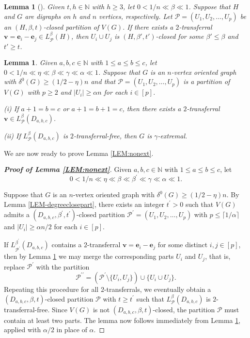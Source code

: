 \documentclass[11pt,a4paper,reqno]{amsart}
\newtheorem{lemma}[theorem]{Lemma}
\theoremstyle{definition} %
\begin{document}
\begin{lemma} [\cite{hanRSA64}] \label{LEM-transclosed}
Given $t,h\in \mathbb{N}$ with $h\geqslant 3$, let $0<1/n\ll\beta\ll 1$. Suppose that $H$ and $G$ are digraphs on $h$ and $n$ vertices, respectively. Let $\mathcal{P}=(U_1,U_2,\ldots,U_p)$ be an $(H,\beta,t)$-closed partition of $V(G)$. If there exists a $2$-transferral $\mathbf{v}=\mathbf{e}_i-\mathbf{e}_j\in L^\beta_{\mathcal{P}}(H)$, then $U_i\cup U_j$ is $(H,\beta',t')$-closed for some $\beta'\leqslant \beta$ and $t'\geqslant t$.
\end{lemma}

\begin{lemma}\label{LEM:transferral}
Given $a,b,c \in \mathbb{N}$ with $1\leqslant a\leqslant b\leqslant c$, let $0<1/n\ll \eta\ll \beta \ll\gamma \ll \alpha\ll 1$. Suppose that $G$ is an $n$-vertex oriented graph with $\delta^0(G)\geqslant(1/2-\eta)n$ and that $\mathcal{P}=(U_1,U_2,\ldots,U_p)$ is a partition of $V(G)$ with $p\geqslant 2$ and $|U_i|\geqslant \alpha n$ for each $i\in [p]$.
    
    \rm{(i)} If $a+1=b=c$ or $a+1=b+1=c$, then there exists a $2$-transferral $\mathbf{v} \in L_\mathcal{P}^{\beta}(D_{a,b,c})$.
    
    \rm{(ii)} If $L_\mathcal{P}^{\beta}(D_{a,b,c})$ is $2$-transferral-free, then $G$ is $\gamma$-extremal.
\end{lemma}
We are now ready to prove Lemma \ref{LEM:nonext}.
\begin{proof}[\textbf{Proof of Lemma \ref{LEM:nonext}}]
Given $a,b,c\in\mathbb{N}$ with $1\leqslant a\leqslant b\leqslant c$, let
$$
0<1/n\ll\eta\ll\beta\ll\beta^\prime\ll\gamma\ll \alpha\ll1.
$$

Suppose that $G$ is an $n$-vertex oriented graph with $\delta^0(G)\geqslant(1/2-\eta)n$. By Lemma \ref{LEM-degreeclosepart}, there exists an integer $t^\prime>0$ such that $V(G)$ admits a $(D_{a,b,c},\beta^\prime,t^\prime)$-closed partition $\mathcal{P}^\prime=(U_1,U_2,\ldots,U_p)$ with $p\leqslant \lceil 1/\alpha\rceil$ and $|U_i|\geqslant \alpha n/2$ for each $i\in [p]$. 

If $L^{\beta^\prime}_{\mathcal{P}^\prime}(D_{a,b,c})$ contains a $2$-transferral $\mathbf{v}=\mathbf{e}_i-\mathbf{e}_j$ for some distinct $i,j\in [p]$, then by Lemma \ref{LEM-transclosed} we may merge the corresponding parts $U_i$ and $U_j$, that is, replace $\mathcal{P}^\prime$ with the partition
$$
\mathcal{P}^{\prime\prime}=(\mathcal{P}^\prime\setminus \{U_i,U_j\})\cup \{U_i\cup U_j\}.
$$
Repeating this procedure for all $2$-transferrals, we eventually obtain a $(D_{a,b,c},\beta,t)$-closed partition $\mathcal{P}$ with $t\geqslant t^\prime$ such that $L^\beta_{\mathcal{P}}(D_{a,b,c})$ is $2$-transferral-free. Since $V(G)$ is not $(D_{a,b,c},\beta,t)$-closed, the partition $\mathcal{P}$ must contain at least two parts. The lemma now follows immediately from Lemma \ref{LEM:transferral}, applied with $\alpha/2$ in place of $\alpha$. 
\end{proof}
\end{document}

